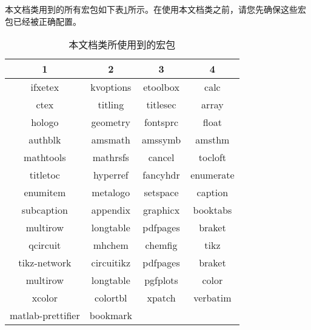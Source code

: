 本文档类用到的所有宏包如下表\ref{tab:dependencies}所示。在使用本文档类之前，请您先确保这些宏包已经被正确配置。

\begin{table}[H]
  \centering
  \caption{本文档类所使用到的宏包}\label{tab:dependencies}
  \begin{tabular}{cccc}
    \toprule
    1 & 2 & 3 & 4 \\
    \midrule
    ifxetex & kvoptions & etoolbox & calc \\
    ctex & titling & titlesec & array \\
    hologo & geometry & fontsprc & float \\
    authblk & amsmath & amssymb & amsthm \\
    mathtools & mathrsfs & cancel & tocloft \\
    titletoc & hyperref & fancyhdr & enumerate \\
    enumitem & metalogo & setspace & caption \\
    subcaption & appendix & graphicx & booktabs \\
    multirow & longtable & pdfpages & braket \\
    qcircuit & mhchem & chemfig & tikz \\
    tikz-network & circuitikz & pdfpages & braket \\
    multirow & longtable & pgfplots & color \\
    xcolor & colortbl & xpatch & verbatim \\
    matlab-prettifier & bookmark &   &   \\
    \bottomrule
  \end{tabular}
\end{table}